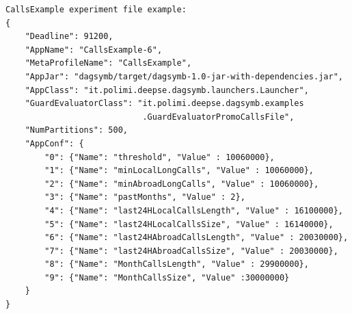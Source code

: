 \begin{verbatim}
CallsExample experiment file example:
{
    "Deadline": 91200,
    "AppName": "CallsExample-6",
    "MetaProfileName": "CallsExample",
    "AppJar": "dagsymb/target/dagsymb-1.0-jar-with-dependencies.jar",
    "AppClass": "it.polimi.deepse.dagsymb.launchers.Launcher",
    "GuardEvaluatorClass": "it.polimi.deepse.dagsymb.examples
                            .GuardEvaluatorPromoCallsFile",
    "NumPartitions": 500,
    "AppConf": {
        "0": {"Name": "threshold", "Value" : 10060000},
        "1": {"Name": "minLocalLongCalls", "Value" : 10060000},
        "2": {"Name": "minAbroadLongCalls", "Value" : 10060000},
        "3": {"Name": "pastMonths", "Value" : 2},
        "4": {"Name": "last24HLocalCallsLength", "Value" : 16100000},
        "5": {"Name": "last24HLocalCallsSize", "Value" : 16140000},
        "6": {"Name": "last24HAbroadCallsLength", "Value" : 20030000},
        "7": {"Name": "last24HAbroadCallsSize", "Value" : 20030000},
        "8": {"Name": "MonthCallsLength", "Value" : 29900000},
        "9": {"Name": "MonthCallsSize", "Value" :30000000}
    }
}
\end{verbatim}

